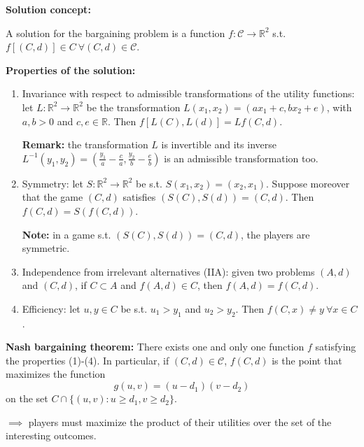 \bigskip
\noindent \textbf{Solution concept:}

\noindent A solution for the bargaining problem is a function $f: \mathcal{C} \rightarrow \mathbb{R}^2$ s.t. $f[(C,d)] \in C ~\forall (C,d) \in \mathcal{C}$.

\bigskip
\noindent \textbf{Properties of the solution:}
\begin{enumerate}
	\item Invariance with respect to admissible transformations of the utility functions: let $L: \mathbb{R}^2 \rightarrow \mathbb{R}^2$ be the transformation $L(x_1,x_2) = (ax_1+c, bx_2 + e)$, with $a,b > 0$ and $c,e \in \mathbb{R}$. Then $f[L(C),L(d)] = Lf(C,d)$.
	
	\noindent \textbf{Remark:} the transformation $L$ is invertible and its inverse $L^{-1}(y_1,y_2) = \left( \frac{y_1}{a} - \frac{c}{a}, \frac{y_2}{b} - \frac{e}{b} \right)$ is an admissible transformation too.
	
	\item Symmetry: let $S: \mathbb{R}^2 \rightarrow \mathbb{R}^2$ be s.t. $S(x_1,x_2) = (x_2,x_1)$. Suppose moreover that the game $(C,d)$ satisfies $(S(C),S(d)) = (C,d)$. Then $f(C,d) = S(f(C,d))$.
	
	\noindent \textbf{Note:} in a game s.t. $(S(C),S(d)) = (C,d)$, the players are symmetric.
	
	\item Independence from irrelevant alternatives (IIA): given two problems $(A,d)$ and $(C,d)$, if $C \subset A$ and $f(A,d) \in C$, then $f(A,d) = f(C,d)$.
	
	\item Efficiency: let $u,y \in C$ be s.t. $u_1 > y_1$ and $u_2 > y_2$. Then $f(C,x) \neq y ~\forall x \in C$.
\end{enumerate}

\bigskip
\noindent \textbf{Nash bargaining theorem:} There exists one and only one function $f$ satisfying the properties (1)-(4). In particular, if $(C,d) \in \mathcal{C}$, $f(C,d)$ is the point that maximizes the function
\[
	g(u,v) = (u - d_1)(v - d_2)
\]
on the set $C \cap \{(u,v): u \geq d_1, v \geq d_2\}$.

\noindent $\implies$ players must maximize the product of their utilities over the set of the interesting outcomes.

